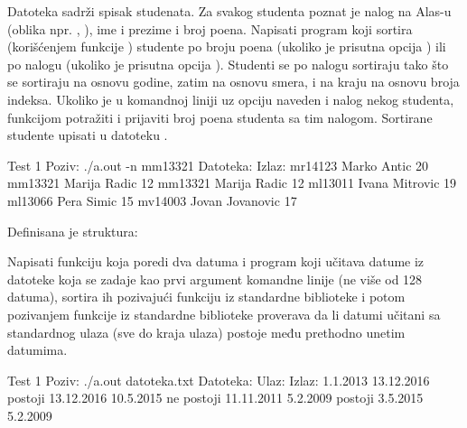 \begin{Exercise}[label=515]
  Datoteka  sadrži spisak studenata. Za svakog
  studenta poznat je nalog na Alas-u (oblika npr. ,
  ), ime i prezime i broj poena. Napisati program koji
  sortira (korišćenjem funkcije ) studente po broju poena
  (ukoliko je prisutna opcija ) ili po nalogu (ukoliko je
  prisutna opcija ). Studenti se po nalogu sortiraju tako što
  se sortiraju na osnovu godine, zatim na osnovu smera, i na kraju na
  osnovu broja indeksa. Ukoliko je u komandnoj liniji uz opciju
   naveden i nalog nekog studenta, funkcijom 
  potražiti i prijaviti broj poena studenta sa tim nalogom. Sortirane
  studente upisati u datoteku .
  
\begin{maxitest}
\begin{test}{Test 1}
Poziv: ./a.out -n mm13321
Datoteka:                         Izlaz:
mr14123 Marko Antic 20            mm13321 Marija Radic 12
mm13321 Marija Radic 12
ml13011 Ivana Mitrovic 19
ml13066 Pera Simic 15
mv14003 Jovan Jovanovic 17
\end{test}
\end{maxitest}
  
\end{Exercise}

\begin{Exercise}[label=516]
  Definisana je struktura:
  \begin{ckod}
    typedef struct { int dan; int mesec; int godina; } Datum;}
  \end{ckod}
  Napisati funkciju koja poredi dva datuma i program koji učitava
  datume iz datoteke koja se zadaje kao prvi argument komandne linije
  (ne više od 128 datuma), sortira ih pozivajući funkciju
   iz standardne biblioteke i potom pozivanjem funkcije
   iz standardne biblioteke proverava da li datumi
  učitani sa standardnog ulaza (sve do kraja ulaza) postoje među
  prethodno unetim datumima.
  
\begin{maxitest}
\begin{test}{Test 1}
Poziv: ./a.out datoteka.txt
Datoteka:            Ulaz:             Izlaz:
1.1.2013             13.12.2016        postoji
13.12.2016           10.5.2015         ne postoji
11.11.2011           5.2.2009          postoji
3.5.2015
5.2.2009
\end{test}
\end{maxitest}
  
\end{Exercise}

